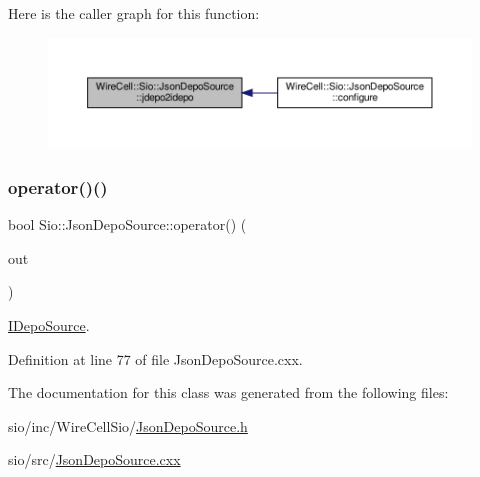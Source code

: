 Here is the caller graph for this function\+:
\nopagebreak
\begin{figure}[H]
\begin{center}
\leavevmode
\includegraphics[width=350pt]{class_wire_cell_1_1_sio_1_1_json_depo_source_a55175816f32320c06cf760ebf9c1e3a3_icgraph}
\end{center}
\end{figure}
\mbox{\label{class_wire_cell_1_1_sio_1_1_json_depo_source_a3f276ed0e080cf1c4d1f1fec5bcd59e4}} 
\subsubsection{\texorpdfstring{operator()()}{operator()()}}
{\footnotesize\ttfamily bool Sio\+::\+Json\+Depo\+Source\+::operator() (\begin{DoxyParamCaption}\item[{\hyperlink{class_wire_cell_1_1_i_data_aff870b3ae8333cf9265941eef62498bc}{I\+Depo\+::pointer} \&}]{out }\end{DoxyParamCaption})\hspace{0.3cm}{\ttfamily [virtual]}}



\hyperlink{class_wire_cell_1_1_i_depo_source}{I\+Depo\+Source}. 



Definition at line 77 of file Json\+Depo\+Source.\+cxx.



The documentation for this class was generated from the following files\+:\begin{DoxyCompactItemize}
\item 
sio/inc/\+Wire\+Cell\+Sio/\hyperlink{_json_depo_source_8h}{Json\+Depo\+Source.\+h}\item 
sio/src/\hyperlink{_json_depo_source_8cxx}{Json\+Depo\+Source.\+cxx}\end{DoxyCompactItemize}

